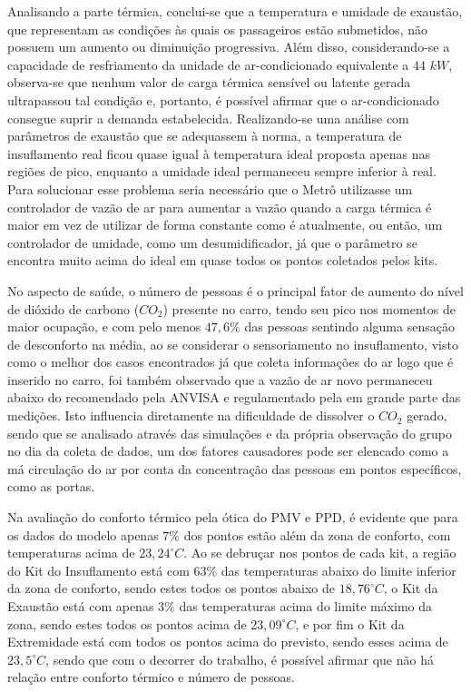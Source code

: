 \documentclass[acronym,symbols,table]{fei}
\begin{document}
Analisando a parte térmica, conclui-se que a temperatura e umidade de exaustão, que representam as condições às quais os passageiros estão submetidos, não possuem um aumento ou diminuição progressiva. Além disso, considerando-se a capacidade de resfriamento da unidade de ar-condicionado equivalente a $44$ $kW$, observa-se que nenhum valor de carga térmica sensível ou latente gerada ultrapassou tal condição e, portanto, é possível afirmar que o ar-condicionado consegue suprir a demanda estabelecida. Realizando-se uma análise com parâmetros de exaustão que se adequassem à norma, a temperatura de insuflamento real ficou quase igual à temperatura ideal proposta apenas nas regiões de pico, enquanto a umidade ideal permaneceu sempre inferior à real. Para solucionar esse problema seria necessário que o Metrô utilizasse um controlador de vazão de ar para aumentar a vazão quando a carga térmica é maior em vez de utilizar de forma constante como é atualmente, ou então, um controlador de umidade, como um desumidificador, já que o parâmetro se encontra muito acima do ideal em quase todos os pontos coletados pelos kits.

No aspecto de saúde, o número de pessoas é o principal fator de aumento do nível de dióxido de carbono (${CO}_{2}$) presente no carro, tendo seu pico nos momentos de maior ocupação, e com pelo menos $47,6\%$ das pessoas sentindo alguma sensação de desconforto na média, ao se considerar o sensoriamento no insuflamento, visto como o melhor dos casos encontrados já que coleta informações do ar logo que é inserido no carro, foi também observado que a vazão de ar novo permaneceu abaixo do recomendado pela ANVISA e regulamentado pela \textcite{abnt216401} em grande parte das medições. Isto influencia diretamente na dificuldade de dissolver o ${CO}_{2}$ gerado, sendo que se analisado através das simulações e da própria observação do grupo no dia da coleta de dados, um dos fatores causadores pode ser elencado como a má circulação do ar por conta da concentração das pessoas em pontos específicos, como as portas. 

Na avaliação do conforto térmico pela ótica do PMV e PPD, é evidente que para os dados do modelo apenas $7\%$ dos pontos estão além da zona de conforto, com temperaturas acima de $23,24^\circ C$. Ao se debruçar nos pontos de cada kit, a região do Kit do Insuflamento está com $63\%$ das temperaturas abaixo do limite inferior da zona de conforto, sendo estes todos os pontos abaixo de $18,76^\circ C$, o Kit da Exaustão está com apenas $3\%$ das temperaturas acima do limite máximo da zona, sendo estes todos os pontos acima de $23,09^\circ C$, e por fim o Kit da Extremidade está com todos os pontos acima do previsto, sendo esses acima de $23,5^\circ C$, sendo que com o decorrer do trabalho, é possível afirmar que não há relação entre conforto térmico e número de pessoas.
\end{document}
